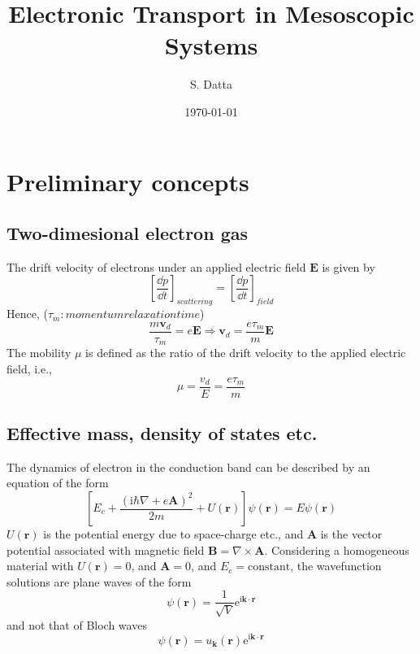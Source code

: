 \documentclass[11pt,a4paper]{book}
\title{Electronic Transport in Mesoscopic Systems}
\author{S. Datta}
\date{\today}
\theoremstyle{plain}
\theoremstyle{definition}
\theoremstyle{remark}
\newcommand{\ii}{\mathrm{i}}                      %
\newcommand{\eexp}{\mathrm{e}}                    %
\renewcommand{\vec}[1]{\boldsymbol{#1}}
\begin{document}
\maketitle

\tableofcontents
\bigskip


\chapter{Preliminary concepts}
\section{Two-dimesional electron gas}
The drift velocity of electrons under an applied electric field $\vec{E}$ is given by
\begin{equation}
    \left[\frac{\dd p}{\dd t}\right]_{scattering} = \left[\frac{\dd p}{\dd t}\right]_{field}
\end{equation}
Hence, ($\tau_m:momentum relaxation time$)
\begin{equation}
    \frac{m \vec{v}_d}{\tau_m} = e \vec{E} \Rightarrow \vec{v}_d = \frac{e \tau_m}{m} \vec{E}
\end{equation}
The mobility $\mu$ is defined as the ratio of the drift velocity to the applied electric field, i.e.,
\begin{equation}
    \mu = \frac{v_d}{E} = \frac{e \tau_m}{m}
\end{equation}

\section{Effective mass, density of states etc.}
The dynamics of electron in the conduction band can be described by an equation of the form
\begin{equation}
    \left[E_c+\frac{(\ii \hbar \nabla + e \vec{A})^2}{2 m} + U(\vec{r})\right] \psi(\vec{r}) = E \psi(\vec{r})
\end{equation}
$U(\vec{r})$ is the potential energy due to space-charge etc., and $\vec{A}$ is the vector potential associated with magnetic field $\vec{B} = \nabla \times \vec{A}$. Considering a homogeneous material with $U(\vec{r}) = 0$, and $\vec{A} = 0$, and $E_c=\mathrm{constant}$, the wavefunction solutions are plane waves of the form
\begin{equation}
    \psi(\vec{r}) = \frac{1}{\sqrt{V}} \eexp^{\ii \vec{k} \cdot \vec{r}}
\end{equation}
and not that of Bloch waves
\begin{equation}
    \psi(\vec{r}) = u_{\vec{k}}(\vec{r}) \eexp^{\ii \vec{k} \cdot \vec{r}}
\end{equation}
\end{document}
